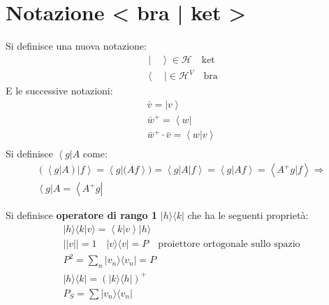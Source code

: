 \section{Notazione < bra | ket >} %
Si definisce una nuova notazione:
\begin{equation}\begin{split}
\left | \quad \right\rangle \in \mathcal{H} \quad \textrm{ket}
\end{split}\end{equation}
\begin{equation}\begin{split}
\left\langle \quad  \right | \in \mathcal{H}^V \quad \textrm{bra}
\end{split}\end{equation}
E le successive notazioni:
\begin{equation}\begin{split}
\bar v=\left |v \right\rangle \\
\bar w^+=\left\langle w \right | \\
\bar w^+\cdot \bar v=\left\langle w|v \right\rangle \\
\end{split}\end{equation}
Si definisce $\left\langle g \right | A$ come:
\begin{equation}\begin{split}
\left(\left\langle g \right | A \right)\left | f \right \rangle = \left\langle g | (Af\right\rangle)=\left\langle g|A|f \right\rangle=\left\langle g|Af \right\rangle=\left\langle A^+g|f \right\rangle \Longrightarrow \\
\left\langle g\right |A=\left\langle A^+g\right |
\end{split}\end{equation}

Si definisce \textbf{operatore di rango 1} $|h\rangle\langle k|$ che ha le seguenti proprietà:
\begin{equation}\begin{split}
|h\rangle\langle k| v\rangle = \left\langle k|v \right\rangle |h\rangle \\
||v||=1 \quad |v\rangle\langle v|=P \quad \textrm{proiettore ortogonale sullo spazio}\\
P^2=\sum_{n}|v_n\rangle\langle v_n|=P \\
|h\rangle\langle k|=\left(|k\rangle\langle h|\right)^+ \\
P_S=\sum |v_n\rangle\langle v_n|
\end{split}\end{equation}

